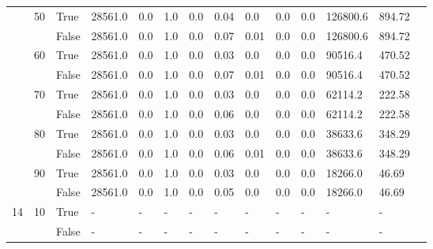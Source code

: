 \begin{appendices}
\begin{landscape}
\begin{small}
\begin{longtable}[c]{@{}lll|ll|ll|ll|ll|lll@{}}
   & 50 & True  & 28561.0         & 0.0            & 1.0           & 0.0           & 0.04          & 0.0           & 0.0           & 0.0           & 126800.6      & 894.72      &  \\
   &    & False & 28561.0         & 0.0            & 1.0           & 0.0           & 0.07          & 0.01          & 0.0           & 0.0           & 126800.6      & 894.72      &  \\
   & 60 & True  & 28561.0         & 0.0            & 1.0           & 0.0           & 0.03          & 0.0           & 0.0           & 0.0           & 90516.4       & 470.52      &  \\
   &    & False & 28561.0         & 0.0            & 1.0           & 0.0           & 0.07          & 0.01          & 0.0           & 0.0           & 90516.4       & 470.52      &  \\
   & 70 & True  & 28561.0         & 0.0            & 1.0           & 0.0           & 0.03          & 0.0           & 0.0           & 0.0           & 62114.2       & 222.58      &  \\
   &    & False & 28561.0         & 0.0            & 1.0           & 0.0           & 0.06          & 0.0           & 0.0           & 0.0           & 62114.2       & 222.58      &  \\
   & 80 & True  & 28561.0         & 0.0            & 1.0           & 0.0           & 0.03          & 0.0           & 0.0           & 0.0           & 38633.6       & 348.29      &  \\
   &    & False & 28561.0         & 0.0            & 1.0           & 0.0           & 0.06          & 0.01          & 0.0           & 0.0           & 38633.6       & 348.29      &  \\
   & 90 & True  & 28561.0         & 0.0            & 1.0           & 0.0           & 0.03          & 0.0           & 0.0           & 0.0           & 18266.0       & 46.69       &  \\
   &    & False & 28561.0         & 0.0            & 1.0           & 0.0           & 0.05          & 0.0           & 0.0           & 0.0           & 18266.0       & 46.69       &  \\
  \midrule
14 & 10 & True  & -               & -              & -             & -             & -             & -             & -             & -             & -             & -           &  \\
   &    & False & -               & -              & -             & -             & -             & -             & -             & -             & -             & -           &  \\

\end{longtable}
\end{small}
\end{landscape}
\end{appendices}
